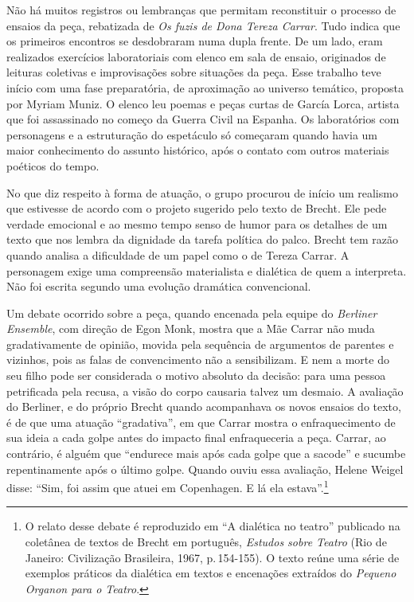 \subject{Ensaios e projeto cênico}

Não há muitos registros ou lembranças que permitam reconstituir o
processo de ensaios da peça, rebatizada de {\it Os fuzis de Dona Tereza
Carrar}. Tudo indica que os primeiros encontros se desdobraram numa
dupla frente. De um lado, eram realizados exercícios laboratoriais com
elenco em sala de ensaio, originados de leituras coletivas e
improvisações sobre situações da peça. Esse trabalho teve início com uma
fase preparatória, de aproximação ao universo temático, proposta por
Myriam Muniz. O elenco leu poemas e peças curtas de García Lorca,
artista que foi assassinado no começo da Guerra Civil na Espanha. Os
laboratórios com personagens e a estruturação do espetáculo só começaram
quando havia um maior conhecimento do assunto histórico, após o contato
com outros materiais poéticos do tempo.

No que diz respeito à forma de atuação, o grupo procurou de início um
realismo que estivesse de acordo com o projeto sugerido pelo texto de
Brecht. Ele pede verdade emocional e ao mesmo tempo senso de humor para
os detalhes de um texto que nos lembra da dignidade da tarefa política
do palco. Brecht tem razão quando analisa a dificuldade de um papel como
o de Tereza Carrar. A personagem exige uma compreensão materialista e
dialética de quem a interpreta. Não foi escrita segundo uma evolução
dramática convencional.

Um debate ocorrido sobre a peça, quando encenada pela equipe do
{\it Berliner Ensemble}, com direção de Egon Monk, mostra que a Mãe
Carrar não muda gradativamente de opinião, movida pela sequência de
argumentos de parentes e vizinhos, pois as falas de convencimento não a
sensibilizam. E nem a morte do seu filho pode ser considerada o motivo
absoluto da decisão: para uma pessoa petrificada pela recusa, a visão do
corpo causaria talvez um desmaio. A avaliação do Berliner, e do próprio
Brecht quando acompanhava os novos ensaios do texto, é de que uma
atuação “gradativa”, em que Carrar mostra o enfraquecimento de sua ideia
a cada golpe antes do impacto final enfraqueceria a peça. Carrar, ao
contrário, é alguém que “endurece mais após cada golpe que a sacode” e
sucumbe repentinamente após o último golpe. Quando ouviu essa avaliação,
Helene Weigel disse: “Sim, foi assim que atuei em Copenhagen. E lá ela
estava”.\footnote{O relato desse debate é reproduzido em “A dialética no
  teatro” publicado na coletânea de textos de Brecht em português,
  {\it Estudos sobre Teatro} (Rio de Janeiro: Civilização Brasileira,
  1967, p.\,154-155). O texto reúne uma série de exemplos práticos da
  dialética em textos e encenações extraídos do {\it Pequeno Organon
  para o Teatro}.}

